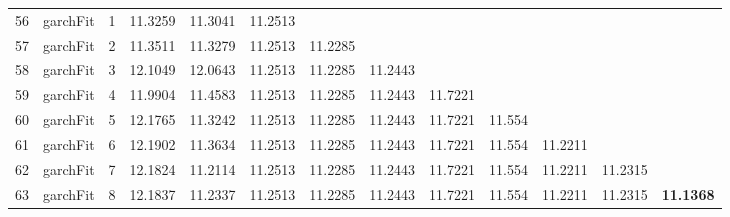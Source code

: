 \documentclass[10pt,a4paper]{article}
\begin{document}
\begin{table}[ht]
\begin{tabular}{rlrllllllllll}
  56 & garchFit &     1 & 11.3259 & 11.3041 & 11.2513 &  &  &  &  &  &  &  \\ 
  57 & garchFit &     2 & 11.3511 & 11.3279 & 11.2513 & 11.2285 &  &  &  &  &  &  \\ 
  58 & garchFit &     3 & 12.1049 & 12.0643 & 11.2513 & 11.2285 & 11.2443 &  &  &  &  &  \\ 
  59 & garchFit &     4 & 11.9904 & 11.4583 & 11.2513 & 11.2285 & 11.2443 & 11.7221 &  &  &  &  \\ 
  60 & garchFit &     5 & 12.1765 & 11.3242 & 11.2513 & 11.2285 & 11.2443 & 11.7221 & 11.554 &  &  &  \\ 
  61 & garchFit &     6 & 12.1902 & 11.3634 & 11.2513 & 11.2285 & 11.2443 & 11.7221 & 11.554 & 11.2211 &  &  \\ 
  62 & garchFit &     7 & 12.1824 & 11.2114 & 11.2513 & 11.2285 & 11.2443 & 11.7221 & 11.554 & 11.2211 & 11.2315 &  \\ 
  63 & garchFit &     8 & 12.1837 & 11.2337 & 11.2513 & 11.2285 & 11.2443 & 11.7221 & 11.554 & 11.2211 & 11.2315 & \textbf{11.1368} \\ 
   \hline
\end{tabular}
\end{table}
\end{document}
